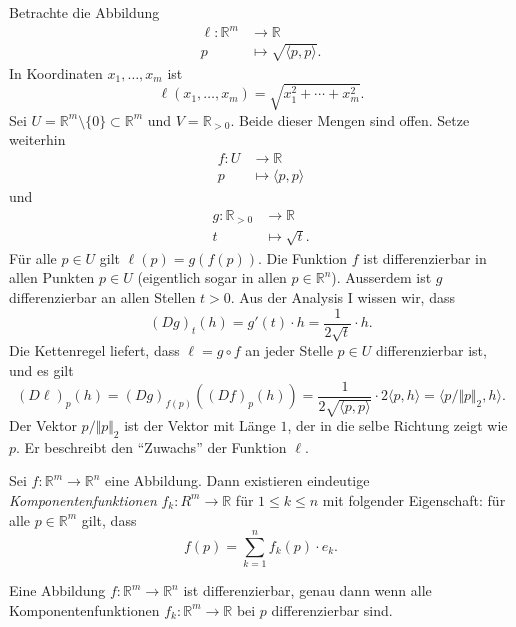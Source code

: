 \documentclass[../main.tex]{subfiles}
\begin{document}
\begin{example}
  Betrachte die Abbildung
  \begin{align*}
    \ell \colon \mathbb{R}^m & \to \mathbb{R} \\
    p & \mapsto \sqrt{\langle p, p \rangle}.
  \end{align*}
  In Koordinaten $x_1, \dots, x_m$ ist
   \[
     \ell(x_1, \dots, x_m) = \sqrt{x_1^2 + \cdots + x_m^2}.
  \]
  Sei $U = \mathbb{R}^m \setminus \{0\} \subset \mathbb{R}^m$ 
  und $V = \mathbb{R}_{>0}$.
  Beide dieser Mengen sind offen. Setze weiterhin
  \begin{align*}
    f \colon U & \to \mathbb{R} \\
    p & \mapsto \langle p, p \rangle
  \end{align*}
  und
  \begin{align*}
    g \colon \mathbb{R}_{>0} & \to \mathbb{R} \\
    t & \mapsto \sqrt t.
  \end{align*}
  Für alle $p \in U$ gilt $\ell(p) = g(f(p))$.
  Die Funktion $f$ ist differenzierbar in allen
  Punkten $p \in U$ 
  (eigentlich sogar in allen $p \in \mathbb{R}^n$).
  Ausserdem ist $g$ differenzierbar an allen Stellen
  $t > 0$.
  Aus der Analysis I wissen wir, dass
  \[
    {(Dg)}_t(h) = g'(t) \cdot h = \frac{1}{2 \sqrt t} \cdot h.
  \]
  Die Kettenregel liefert, dass
  $\ell = g \circ f$ an jeder Stelle $p \in U$ differenzierbar ist,
  und es gilt
  \[
    {(D \ell)}_p(h) = {(Dg)}_{f(p)}({(Df)}_p(h))
    = \frac{1}{2 \sqrt{\langle p, p \rangle}} \cdot 2 \langle p, h \rangle
    = \langle p / \Vert p \Vert_2, h \rangle.
  \]
  Der Vektor $p / \Vert p \Vert_2$ ist der Vektor mit Länge $1$,
  der in die selbe Richtung zeigt wie $p$.
  Er beschreibt den ``Zuwachs'' der Funktion $\ell$.
\end{example}

\begin{definition}
  Sei $f \colon \mathbb{R}^m \to \mathbb{R}^n$ eine Abbildung.
  Dann existieren eindeutige \emph{Komponentenfunktionen}
  $f_k \colon R^m \to \mathbb{R}$ 
  für $1 \leq k \leq n$ mit folgender Eigenschaft:
  für alle $p \in \mathbb{R}^m$ gilt, dass
  \[
    f(p) = \sum_{k=1}^{n} f_k(p) \cdot e_k.
  \]
\end{definition}

\begin{lemma*}
  Eine Abbildung $f \colon \mathbb{R}^m \to \mathbb{R}^n$ ist differenzierbar,
  genau dann wenn alle Komponentenfunktionen 
  $f_k \colon \mathbb{R}^m \to \mathbb{R}$ bei $p$ differenzierbar sind.
\end{lemma*}
\end{document}
